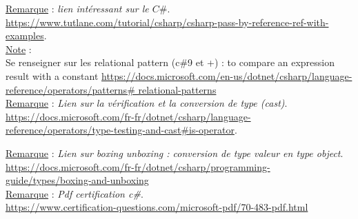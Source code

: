 \documentclass[a4paper,12pt,twoside]{article}
\newcommand{\rem}[2]{\noindent\underline{Remarque} : \textit{#1}.\\ \indent #2}
\newcommand{\note}[1]{\noindent\underline{Note} : \\ \indent #1}
\begin{document}
\rem{lien intéressant sur le $C\#$}{ \url{https://www.tutlane.com/tutorial/csharp/csharp-pass-by-reference-ref-with-examples}.}\\

\note{Se renseigner sur les relational pattern (c\#9 et +) : to compare an expression result with a constant \url{https://docs.microsoft.com/en-us/dotnet/csharp/language-reference/operators/patterns\# relational-patterns}}\\

\rem{Lien sur la vérification et la conversion de type (cast)}{\url{https://docs.microsoft.com/fr-fr/dotnet/csharp/language-reference/operators/type-testing-and-cast\#is-operator}.}

\rem{Lien sur boxing unboxing : conversion de type valeur en type object}{\url{https://docs.microsoft.com/fr-fr/dotnet/csharp/programming-guide/types/boxing-and-unboxing}}\\

\rem{Pdf certification c\#}{\url{https://www.certification-questions.com/microsoft-pdf/70-483-pdf.html}}\\

\newpage
\printglossary[type=\acronymtype]%
\glsaddallunused %
\printglossary[type = main,nonumberlist]%
\end{document}
